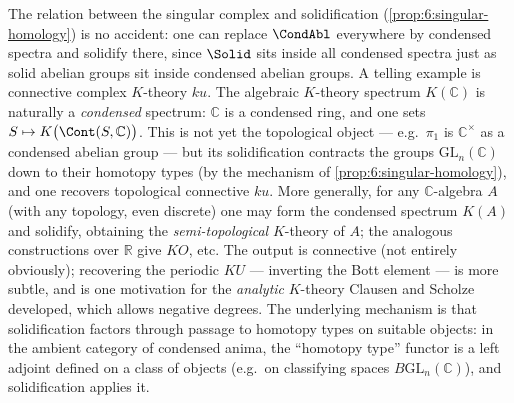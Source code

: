 \begin{remark}
\label{rmk:6:K-theory}
The relation between the singular complex and solidification
(\cref{prop:6:singular-homology}) is no accident: one can replace $\CondAbl$
everywhere by condensed spectra and solidify there, since $\Solid$ sits inside
all condensed spectra just as solid abelian groups sit inside condensed abelian
groups. A telling example is connective complex $K$-theory $ku$. The algebraic
$K$-theory spectrum $K(\mathbb{C})$ is naturally a \emph{condensed} spectrum:
$\mathbb{C}$ is a condensed ring, and one sets
$S\mapsto K\bigl(\Cont(S,\mathbb{C})\bigr)$. This is not yet the topological
object --- e.g.\ $\pi_1$ is $\mathbb{C}^{\times}$ as a condensed abelian group ---
but its solidification contracts the groups $\mathrm{GL}_n(\mathbb{C})$ down to
their homotopy types (by the mechanism of \cref{prop:6:singular-homology}), and
one recovers topological connective $ku$. More generally, for any
$\mathbb{C}$-algebra $A$ (with any topology, even discrete) one may form the
condensed spectrum $K(A)$ and solidify, obtaining the \emph{semi-topological}
$K$-theory of $A$; the analogous constructions over $\mathbb{R}$ give $KO$, etc.
The output is connective (not entirely obviously); recovering the periodic $KU$
--- inverting the Bott element --- is more subtle, and is one motivation for the
\emph{analytic} $K$-theory Clausen and Scholze developed, which allows negative
degrees. The underlying mechanism is that solidification factors through passage
to homotopy types on suitable objects: in the ambient category of condensed
anima, the ``homotopy type'' functor is a left adjoint defined on a class of
objects (e.g.\ on classifying spaces $B\mathrm{GL}_n(\mathbb{C})$), and
solidification applies it.
\end{remark}
